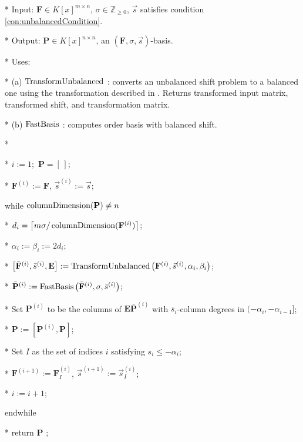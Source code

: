 %
\begin{algorithm}
\caption{$\umab\left(\mathbf{F},\sigma,\vec{s}\right)$ }


\label{alg:umab} 
\begin{algor}
\item [{{{*}}}] Input: $\mathbf{F}\in K\left[x\right]^{m\times n}$,
$\sigma\in\mathbb{Z}_{\ge0}$, $\vec{s}$ satisfies condition \eqref{con:unbalancedCondition}.
\item [{{{*}}}] Output: $\mathbf{P}\in K\left[x\right]^{n\times n}$,
an $\left(\mathbf{F},\sigma,\vec{s}\right)$-basis.
\item [{{{*}}}] Uses:
\item [{{*}}] (a) $\TransformUnbalanced$ : converts an unbalanced shift
problem to a balanced one using the transformation described in .
Returns transformed input matrix, transformed shift, and transformation
matrix.
\item [{{*}}] (b) %
$\mmab$ : computes order basis with balanced shift. 
\item [{{*}}]~\end{algor}
\begin{algor}[1]
\item [{{{*}}}]  $i:=1;$ $\mathbf{P}=[\,]$;
\item [{{{*}}}] $\mathbf{F}^{\left(i\right)}:=\mathbf{F}$, $\vec{s}^{\left(i\right)}:=\vec{s}$;
\item [{{while}}] $\columnDimension(\mathbf{P})\ne n$
\item [{{{*}}}] $d_{i}=\left\lceil m\sigma/\columnDimension(\mathbf{F}^{\left(i\right)})\right\rceil $;
\item [{{{*}}}] $\alpha_{i}:=\beta_{i}:=2d_{i};$
\item [{{{*}}}] $\left[\bar{\mathbf{F}}^{\left(i\right)},\bar{s}^{\left(i\right)},\mathbf{E}\right]:=\TransformUnbalanced\left(\mathbf{F}^{\left(i\right)},\vec{s}^{\left(i\right)},\alpha_{i},\beta_{i}\right)$;
\item [{{{*}}}] $\bar{\mathbf{P}}^{\left(i\right)}:=\mmab\left(\bar{\mathbf{F}}^{\left(i\right)},\sigma,\bar{s}^{\left(i\right)}\right)$;
\item [{{{*}}}] Set $\mathbf{P}^{\left(i\right)}$ to be the columns
of $\mathbf{E}\bar{\mathbf{P}}^{\left(i\right)}$ with $\bar{s}_{i}$-column
degrees in $(-\alpha_{i},-\alpha_{i-1}]$;
\item [{{{*}}}] $\mathbf{P}:=\left[\mathbf{P}^{\left(i\right)},\mathbf{P}\right]$;
\item [{{{*}}}] Set $I$ as the set of indices $i$ satisfying $s_{i}\le-\alpha_{i}$;
\item [{{{*}}}] $\mathbf{F}^{\left(i+1\right)}:=\mathbf{F}_{I}^{\left(i\right)}$,
$\vec{s}^{\left(i+1\right)}:=\vec{s}_{I}^{\left(i\right)}$;
\item [{{{*}}}] $i:=i+1$;
\item [{{endwhile}}] ~
\item [{{{*}}}] return $\mathbf{P}$ ; 
\end{algor}

\end{algorithm}

